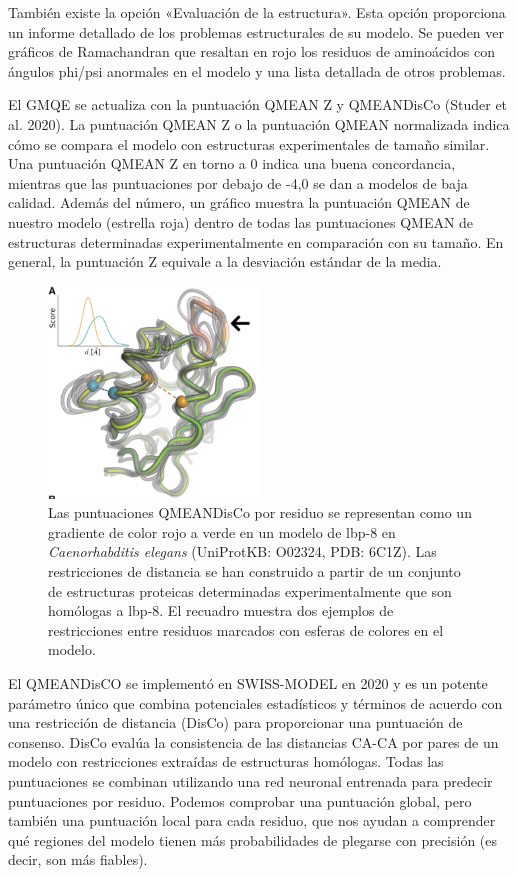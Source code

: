 También existe la opción «Evaluación de la estructura». Esta opción proporciona un informe detallado de los problemas estructurales de su modelo. Se pueden ver gráficos de Ramachandran que resaltan en rojo los residuos de aminoácidos con ángulos phi/psi anormales en el modelo y una lista detallada de otros problemas.

El GMQE se actualiza con la puntuación QMEAN Z y QMEANDisCo (Studer et al. 2020). La puntuación QMEAN Z o la puntuación QMEAN normalizada indica cómo se compara el modelo con estructuras experimentales de tamaño similar. Una puntuación QMEAN Z en torno a 0 indica una buena concordancia, mientras que las puntuaciones por debajo de -4,0 se dan a modelos de baja calidad. Además del número, un gráfico muestra la puntuación QMEAN de nuestro modelo (estrella roja) dentro de todas las puntuaciones QMEAN de estructuras determinadas experimentalmente en comparación con su tamaño. En general, la puntuación Z equivale a la desviación estándar de la media.

\begin{figure}[h]
\centering
\includegraphics[width = 0.5\textwidth]{figs/paste-C2BED0C6.png}
\caption{Las puntuaciones QMEANDisCo por residuo se representan como un gradiente de color rojo a verde en un modelo de lbp-8 en \textit{Caenorhabditis elegans} (UniProtKB: O02324, PDB: 6C1Z). Las restricciones de distancia se han construido a partir de un conjunto de estructuras proteicas determinadas experimentalmente que son homólogas a lbp-8. El recuadro muestra dos ejemplos de restricciones entre residuos marcados con esferas de colores en el modelo. }
\end{figure}

El QMEANDisCO se implementó en SWISS-MODEL en 2020 y es un potente parámetro único que combina potenciales estadísticos y términos de acuerdo con una restricción de distancia (DisCo) para proporcionar una puntuación de consenso. DisCo evalúa la consistencia de las distancias CA-CA por pares de un modelo con restricciones extraídas de estructuras homólogas. Todas las puntuaciones se combinan utilizando una red neuronal entrenada para predecir puntuaciones por residuo. Podemos comprobar una puntuación global, pero también una puntuación local para cada residuo, que nos ayudan a comprender qué regiones del modelo tienen más probabilidades de plegarse con precisión (es decir, son más fiables).

